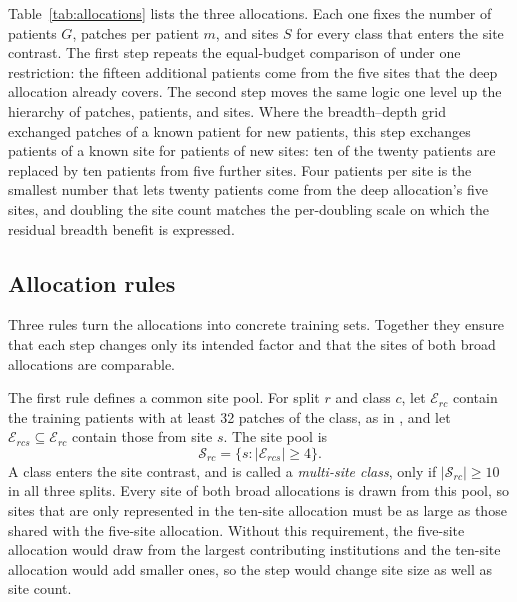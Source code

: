 \documentclass[11pt]{article}
\begin{document}
\noindent Table~\ref{tab:allocations} lists the three allocations. Each one fixes the number of patients $G$, patches per patient $m$, and sites $S$ for every class that enters the site contrast. The first step repeats the equal-budget comparison of \citet{queisler2026effectiveSupport} under one restriction: the fifteen additional patients come from the five sites that the deep allocation already covers. The second step moves the same logic one level up the hierarchy of patches, patients, and sites. Where the breadth--depth grid exchanged patches of a known patient for new patients, this step exchanges patients of a known site for patients of new sites: ten of the twenty patients are replaced by ten patients from five further sites. Four patients per site is the smallest number that lets twenty patients come from the deep allocation's five sites, and doubling the site count matches the per-doubling scale on which the residual breadth benefit is expressed.

\subsection{Allocation rules}
\label{sec:allocation}
Three rules turn the allocations into concrete training sets. Together they ensure that each step changes only its intended factor and that the sites of both broad allocations are comparable.

The first rule defines a common site pool. For split $r$ and class $c$, let $\mathcal E_{rc}$ contain the training patients with at least 32 patches of the class, as in \citet{queisler2026effectiveSupport}, and let $\mathcal E_{rcs}\subseteq\mathcal E_{rc}$ contain those from site $s$. The site pool is
\begin{equation}
 \mathcal S_{rc}=\{s:|\mathcal E_{rcs}|\ge 4\}.
 \label{eq:site-pool}
\end{equation}
\noindent A class enters the site contrast, and is called a \emph{multi-site class}, only if $|\mathcal S_{rc}|\ge 10$ in all three splits. Every site of both broad allocations is drawn from this pool, so sites that are only represented in the ten-site allocation must be as large as those shared with the five-site allocation. Without this requirement, the five-site allocation would draw from the largest contributing institutions and the ten-site allocation would add smaller ones, so the step would change site size as well as site count.
\end{document}
